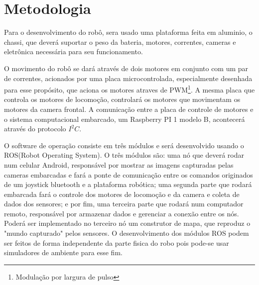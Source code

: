 \documentclass[a4paper,12pt]{article}
\begin{document}
\section{Metodologia}
	Para o desenvolvimento do robô, sera usado uma plataforma feita em aluminio, o chassi, que deverá suportar o peso da bateria, motores, correntes, cameras e eletrônica necessária para seu funcionamento.\par
	O movimento do robô se dará através de dois motores em conjunto com um par de correntes, acionados por uma placa microcontrolada, especialmente desenhada para esse propósito, que aciona os motores atraves de PWM\footnote{Modulação por largura de pulso}. A mesma placa que controla os motores de locomoção, controlará os motores que movimentam os motores da camera frontal. A comunicação entre a placa de controle de motores e o sistema computacional embarcado, um Raspberry PI 1 modelo B, acontecerá através do protocolo $I^2C$. \par
	O software de operação consiste em três módulos e será desenvolvido usando o ROS(Robot Operating System). O três módulos são: uma nó que deverá rodar num celular Android, responsável por mostrar as imagens capturadas pelas cameras embarcadas e fará a ponte de comunicação entre os comandos originados de um joystick bluetooth e a plataforma robótica; uma segunda parte que rodará embarcada fará o controle dos motores de locomoção e da camera e coleta de dados dos sensores; e por fim, uma terceira parte que rodará num computador remoto, responsável por armazenar dados e gerenciar a conexão entre os nós. Poderá ser implementado no terceiro nó um construtor de mapa, que reproduz o "mundo capturado" pelos sensores. O desenvolvimento dos módulos ROS podem ser feitos de forma independente da parte fisica do robo pois pode-se usar simuladores de ambiente para esse fim.\par
	
\end{document}
